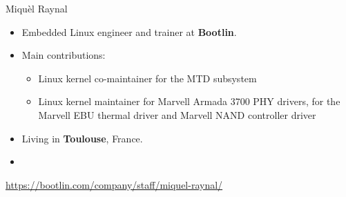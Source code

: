 \begin{frame}{Miquèl Raynal}
  \begin{itemize}
    \item Embedded Linux engineer and trainer at {\bf Bootlin}.
    \item Main contributions:
    \begin{itemize}
      \item Linux kernel co-maintainer for the MTD subsystem
      \item Linux kernel maintainer for Marvell Armada 3700 PHY drivers,
        for the Marvell EBU thermal driver and Marvell NAND controller driver
    \end{itemize}
    \item Living in {\bf Toulouse}, France.
    \item {}
  \end{itemize}
  {\small \url{https://bootlin.com/company/staff/miquel-raynal/}}
\end{frame}
